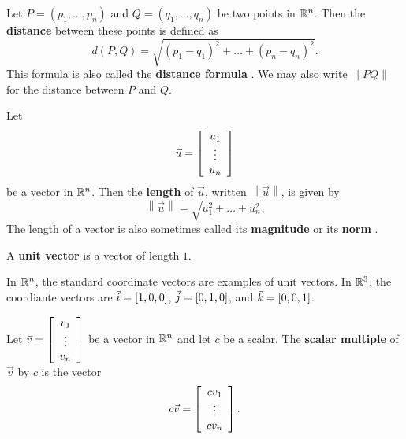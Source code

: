 \documentclass{ximera}
\begin{document}
\begin{definition}\label{def:distpoints}
  
    Let $P=(p_1,\ldots,p_n)$ and $Q=(q_1,\ldots,q_n)$ be two points in
    $\R^n$. Then the \textbf{distance}%
     between these points is defined as
    \begin{equation*}
      d(P, Q) = \sqrt{(p_1-q_1)^2 + \ldots + (p_n-q_n)^2}.
    \end{equation*}
    This formula is also called the \textbf{distance formula}%
    . We may also write $\left\|PQ\right\|$ for the
    distance between $P$ and $Q$.
\end{definition}

\begin{definition}\label{def:veclength}
    Let
    \begin{equation*}
      \vec{u} = \startmat{c} u_1 \\ \vdots \\ u_n \stopmat
    \end{equation*}
    be a vector in $\R^n$. Then the \textbf{length}%
     of $\vec{u}$, written $\left\| \vec{u} \right\|$,
    is given by
    \begin{equation*}
      \left\| \vec{u} \right\| = \sqrt{u_1^2 + \ldots + u_n^2}.
    \end{equation*}
    The length of a vector is also sometimes called its
    \textbf{magnitude}%
     or its
    \textbf{norm}%
    .
\end{definition}

\begin{definition}\label{def:unitvec}

    A \textbf{unit vector} is a vector of length $1$. 

    In $\R^n$, the standard coordinate vectors are examples of unit vectors. In $\R^3$, the coordiante vectors are $\vect{i}=[1,0,0]$, $\vect{j}=[0,1,0]$, and $\vect{k}=[0,0,1]$.
\end{definition}

\begin{definition}\label{def:scalarmult}

    Let $\vec{v} = \startmat{c} v_1 \\ \vdots \\ v_n \stopmat$ be a vector in $\R^n$ and let $c$ be a scalar. The \textbf{scalar multiple} of $\vec{v}$ by $c$ is the vector
    \begin{equation*}
      c\vec{v} = \startmat{c} cv_1 \\ \vdots \\ cv_n \stopmat.
    \end{equation*}

\end{definition}
\end{document}
